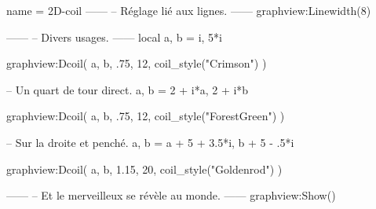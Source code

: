 \documentclass[varwidth]{standalone}
\begin{document}
\begin{luadraw}{name = 2D-coil}
------
-- Réglage lié aux lignes.
------
graphview:Linewidth(8)

------
-- Divers usages.
------
local a, b = i, 5*i

graphview:Dcoil(
  a, b,
  .75,
  12,
  coil_style("Crimson")
)

-- Un quart de tour direct.
a, b = 2 + i*a, 2 + i*b

graphview:Dcoil(
  a, b,
  .75,
  12,
  coil_style("ForestGreen")
)

-- Sur la droite et penché.
a, b = a + 5 + 3.5*i, b + 5 - .5*i

graphview:Dcoil(
  a, b,
  1.15,
  20,
  coil_style("Goldenrod")
)

------
-- Et le merveilleux se révèle au monde.
------
graphview:Show()
\end{luadraw}
\end{document}
